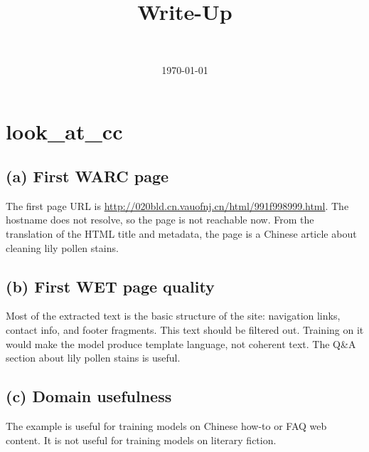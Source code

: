 \documentclass[11pt]{article}
\title{\assignment\\\large Write-Up}
\author{\studentname\\\sunetid}
\date{\today}
\newcommand{\answer}[1]{#1}
\begin{document}
\maketitle


\section{look\_at\_cc}
\subsection*{(a) First WARC page}
\answer{The first page URL is \url{http://020bld.cn.vauofnj.cn/html/991f998999.html}. The hostname does not resolve, so the page is not reachable now. From the translation of the HTML title and metadata, the page is a Chinese article about cleaning lily pollen stains.}

\subsection*{(b) First WET page quality}
\answer{Most of the extracted text is the basic structure of the site: navigation links, contact info, and footer fragments. This text should be filtered out. Training on it would make the model produce template language, not coherent text. The Q\&A section about lily pollen stains is useful.}

\subsection*{(c) Domain usefulness}
\answer{The example is useful for training models on Chinese how-to or FAQ web content. It is not useful for training models on literary fiction.}
\end{document}
